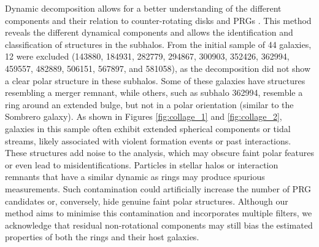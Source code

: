 \documentclass[fleqn,usenatbib]{mnras}
\begin{document}
Dynamic decomposition allows for a better understanding of the different components and their relation to counter-rotating disks and PRGs \citep{2020_Khoperskov}. This method reveals the different dynamical components and allows the identification and classification of structures in the subhalos. From the initial sample of 44 galaxies, 12 were excluded (143880, 184931, 282779, 294867, 300903, 352426, 362994, 459557, 482889, 506151, 567897, and 581058), as the decomposition did not show a clear polar structure in these subhalos. Some of these galaxies have structures resembling a merger remnant, while others, such as subhalo 362994, resemble a ring around an extended bulge, but not in a polar orientation (similar to the Sombrero galaxy). {As shown in Figures \ref{fig:collage_1} and \ref{fig:collage_2}, galaxies in this sample often exhibit extended spherical components or tidal streams, likely associated with violent formation events or past interactions. These structures add noise to the analysis, which may obscure faint polar features or even lead to misidentifications. Particles in stellar halos or interaction remnants that have a similar dynamic as rings may produce spurious measurements. Such contamination could artificially increase the number of PRG candidates or, conversely, hide genuine faint polar structures. Although our method aims to minimise this contamination and incorporates multiple filters, we acknowledge that residual non-rotational components may still bias the estimated properties of both the rings and their host galaxies.}
\end{document}
